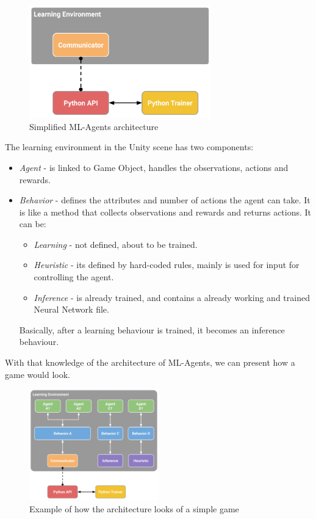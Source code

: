 \documentclass[a4paper, 12pt]{book}
\begin{document}
\begin{figure}[h]
\begin{center}
\includegraphics[width=0.7\textwidth]{Images/learning_environment_basic.png}
\end{center}
\caption{Simplified ML-Agents architecture \cite{MLAgents}}
\label{pic6}
\end{figure}


\clearpage

The learning environment in the Unity scene has two components:
\begin{itemize}
    \item \emph{Agent} - is linked to Game Object, handles the observations, actions and rewards.
    \item \emph{Behavior} - defines the attributes and number of actions the agent can take. It is like a method that collects observations and rewards and returns actions. It can be:
    \begin{itemize}
        \item \emph{Learning} - not defined, about to be trained.
        \item \emph{Heuristic} - its defined by hard-coded rules, mainly is used for input for controlling the agent.
        \item \emph{Inference} - is already trained, and contains a already working and trained Neural Network file.
    \end{itemize}
    Basically, after a learning behaviour is trained, it becomes an inference behaviour.
\end{itemize}

With that knowledge of the architecture of ML-Agents, we can present how a game would look.

\begin{figure}[h]
\begin{center}
\includegraphics[width=0.5\textwidth]{Images/learning_environment_example.png}
\end{center}
\caption{Example of how the architecture looks of a simple game \cite{MLAgents}}
\label{pic7}
\end{figure}
\end{document}
